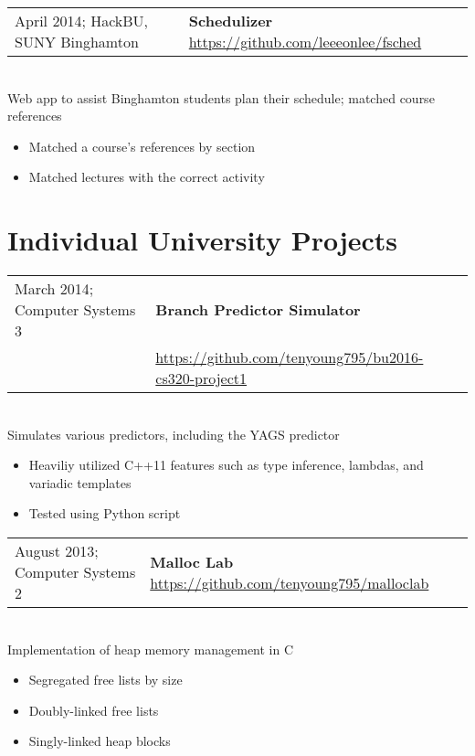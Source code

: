 \documentclass[letterpaper,10pt]{article} %
\begin{document}
\begin{tabular}{@{}p{3in}l}
    April 2014; HackBU, SUNY Binghamton & \textbf{Schedulizer} \footnotesize{\url{https://github.com/leeeonlee/fsched}}
\end{tabular} \\
Web app to assist Binghamton students plan their schedule; matched course references
\begin{itemize}
    \item Matched a course's references by section
    \item Matched lectures with the correct activity
\end{itemize}

\section{Individual University Projects}

\begin{tabular}{@{}p{3in}l}
    March 2014; Computer Systems 3 & \textbf{Branch Predictor Simulator} \\
    & \footnotesize{\url{https://github.com/tenyoung795/bu2016-cs320-project1}}
\end{tabular} \\
Simulates various predictors, including the YAGS predictor
\begin{itemize}
    \item Heaviliy utilized C++11 features such as type inference, lambdas, and variadic templates
    \item Tested using Python script
\end{itemize}

\begin{tabular}{@{}p{3in}l}
    August 2013; Computer Systems 2 & \textbf{Malloc Lab} \footnotesize{\url{https://github.com/tenyoung795/malloclab}}
\end{tabular} \\
Implementation of heap memory management in C
\begin{itemize}
    \item Segregated free lists by size
    \item Doubly-linked free lists
    \item Singly-linked heap blocks
\end{itemize}
\end{document}
